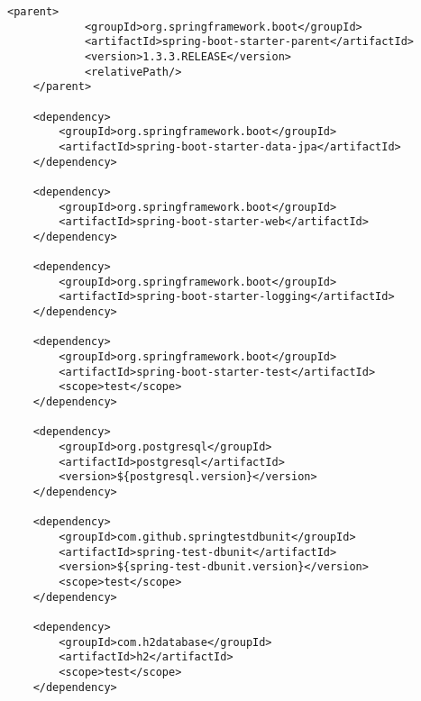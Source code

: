 \begin{lstlisting}[style=XML,label=Func:POMMonitorWebApi,caption={[Arquivo POM com as principais dependências do projeto.]Arquivo POM com as principais dependências do projeto.}]
	<parent>
			<groupId>org.springframework.boot</groupId>
			<artifactId>spring-boot-starter-parent</artifactId>
			<version>1.3.3.RELEASE</version>
			<relativePath/>
	</parent>
	
	<dependency>
		<groupId>org.springframework.boot</groupId>
		<artifactId>spring-boot-starter-data-jpa</artifactId>
	</dependency>
	
	<dependency>
		<groupId>org.springframework.boot</groupId>
		<artifactId>spring-boot-starter-web</artifactId>
	</dependency>

	<dependency>
		<groupId>org.springframework.boot</groupId>
		<artifactId>spring-boot-starter-logging</artifactId>
	</dependency>

	<dependency>
		<groupId>org.springframework.boot</groupId>
		<artifactId>spring-boot-starter-test</artifactId>
		<scope>test</scope>
	</dependency>
				
	<dependency>
		<groupId>org.postgresql</groupId>
		<artifactId>postgresql</artifactId>
		<version>${postgresql.version}</version>
	</dependency>

	<dependency>
		<groupId>com.github.springtestdbunit</groupId>
		<artifactId>spring-test-dbunit</artifactId>
		<version>${spring-test-dbunit.version}</version>
		<scope>test</scope>
	</dependency>

	<dependency>
		<groupId>com.h2database</groupId>
		<artifactId>h2</artifactId>
		<scope>test</scope>
	</dependency>
\end{lstlisting}

%

